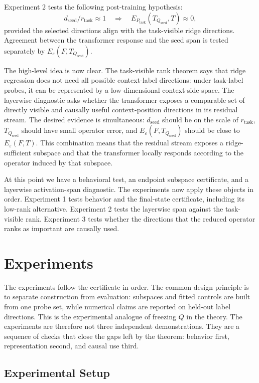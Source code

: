 \documentclass[11pt]{article}
\begin{document}
Experiment 2 tests the following post-training hypothesis:
\[
d_{\mathrm{seed}}/r_{\mathrm{task}}\approx 1
\quad\Longrightarrow\quad
E_{P_{\mathrm{task}}}(T_{Q_{\mathrm{seed}}},T)\approx 0,
\]
provided the selected directions align with the task-visible ridge directions. Agreement between
the transformer response and the seed span is tested separately by
\(E_\varepsilon(F,T_{Q_{\mathrm{seed}}})\).

The high-level idea is now clear. The task-visible rank theorem says that ridge regression does
not need all possible context-label directions: under task-label probes, it can be represented by a
low-dimensional context-side space. The layerwise diagnostic asks whether the transformer exposes
a comparable set of directly visible and causally useful context-position directions in its
residual stream. The desired evidence is simultaneous: \(d_{\mathrm{seed}}\) should be on the scale of
\(r_{\mathrm{task}}\), \(T_{Q_{\mathrm{seed}}}\) should have small operator error, and
\(E_\varepsilon(F,T_{Q_{\mathrm{seed}}})\) should be close to \(E_\varepsilon(F,T)\). This combination
means that the residual stream exposes a ridge-sufficient subspace and that the transformer
locally responds according to the operator induced by that subspace.

At this point we have a behavioral test, an endpoint subspace certificate, and a layerwise
activation-span diagnostic. The experiments now apply these objects in order. Experiment 1 tests
behavior and the final-state certificate, including its low-rank alternative. Experiment 2 tests the
layerwise span against the task-visible rank. Experiment 3 tests whether the directions that the
reduced operator ranks as important are causally used.

\section{Experiments}

The experiments follow the certificate in order. The common design principle is to separate
construction from evaluation: subspaces and fitted controls are built from one probe set, while
numerical claims are reported on held-out label directions. This is the experimental analogue of
freezing \(Q\) in the theory. The experiments are therefore not three independent demonstrations.
They are a sequence of checks that close the gaps left by the theorem: behavior first,
representation second, and causal use third.

\subsection{Experimental Setup}
\end{document}
